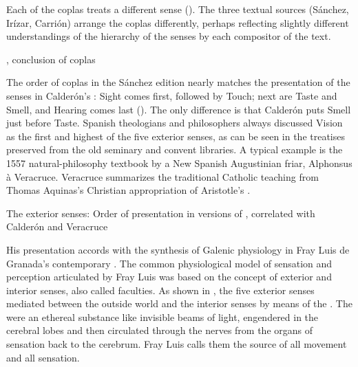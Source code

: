 Each of the coplas treats a different sense ().
The three textual sources (Sánchez, Irízar, Carrión) arrange the coplas differently, perhaps reflecting slightly different understandings of the hierarchy of the senses by each compositor of the text.

\begin{expoem}
\caption{, conclusion of coplas}
\label{expoem:Si_los_sentidos-Sanchez-coplas}
\end{expoem}

The order of coplas in the Sánchez edition nearly matches the presentation of the senses in Calderón's : Sight comes first, followed by Touch; next are Taste and Smell, and Hearing comes last ().
The only difference is that Calderón puts Smell just before Taste.
Spanish theologians and philosophers always discussed Vision as the first and highest of the five exterior senses, as can be seen in the treatises preserved from the old seminary and convent libraries.
A typical example is the 1557 natural-philosophy textbook  by a New Spanish Augustinian friar, Alphonsus à Veracruce.%
  \autocite{Veracruce:Phisica}
Veracruce summarizes the traditional Catholic teaching from Thomas Aquinas's Christian appropriation of Aristotle's .

\begin{table}
\caption{The exterior senses: Order of presentation in versions of , correlated with Calderón and Veracruce}
\label{table:senses-order}
\end{table}

His presentation accords with the synthesis of Galenic physiology in Fray Luis de Granada's contemporary .%
  \autocite[\XXX]{LuisdeGranada:Simbolo}
The common physiological model of sensation and perception articulated by Fray Luis was based on the concept of exterior and interior senses, also called faculties.
As shown in , the five exterior senses mediated between the outside world and the interior senses by means of the .
The  were an ethereal substance like invisible beams of light, engendered in the cerebral lobes and then circulated through the nerves from the organs of sensation back to the cerebrum.
Fray Luis calls them the source of all movement and all sensation.

